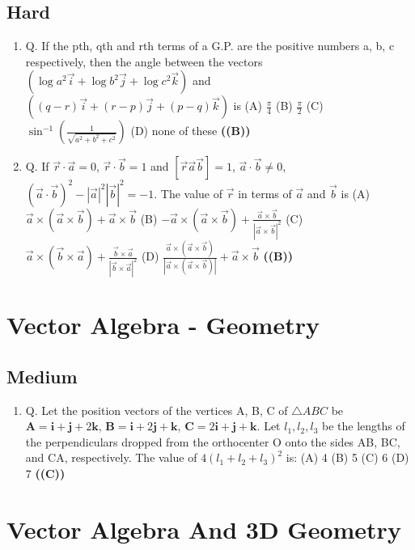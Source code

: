 \documentclass{article}
\begin{document}
\subsection{Hard}
\begin{enumerate}
\item Q. If the pth, qth and rth terms of a G.P. are the positive numbers a, b, c respectively, then the angle between the vectors $(\log a^2 \vec{i} + \log b^2 \vec{j} + \log c^2 \vec{k})$ and $((q-r)\vec{i} + (r-p)\vec{j} + (p-q) \vec{k})$ is
(A) $\frac{\pi}{4}$
(B) $\frac{\pi}{2}$
(C) $\sin^{-1}(\frac{1}{\sqrt{a^2+b^2+c^2}})$
(D) none of these \hfill \textbf{((B))}
\item Q. If $\vec{r}\cdot \vec{a} = 0$, $\vec{r}\cdot \vec{b} = 1$ and $[\vec{r}\vec{a}\vec{b}] = 1$, $\vec{a} \cdot \vec{b} \neq 0$, $(\vec{a} \cdot \vec{b})^2 - |\vec{a}|^2|\vec{b}|^2 = -1$. The value of $\vec{r}$ in terms of $\vec{a}$ and $\vec{b}$ is
(A) $\vec{a} \times (\vec{a} \times \vec{b}) + \vec{a} \times \vec{b}$
(B) $-\vec{a} \times (\vec{a} \times \vec{b}) + \frac{\vec{a}\times\vec{b}}{|\vec{a}\times\vec{b}|^2}$
(C) $\vec{a} \times (\vec{b}\times\vec{a}) + \frac{\vec{b}\times\vec{a}}{|\vec{b}\times\vec{a}|^2}$
(D) $\frac{\vec{a}\times(\vec{a}\times\vec{b})}{|\vec{a}\times(\vec{a}\times\vec{b})|} + \vec{a}\times\vec{b}$ \hfill \textbf{((B))}
\end{enumerate}
\section{Vector Algebra - Geometry}
\subsection{Medium}
\begin{enumerate}
\item Q. Let the position vectors of the vertices A, B, C of $\triangle ABC$ be
$\mathbf{A} = \mathbf{i} + \mathbf{j} + 2\mathbf{k}$, $\mathbf{B} = \mathbf{i} + 2\mathbf{j} + \mathbf{k}$, $\mathbf{C} = 2\mathbf{i} + \mathbf{j} + \mathbf{k}$.
Let $l_1, l_2, l_3$ be the lengths of the perpendiculars dropped from the orthocenter O onto the sides AB, BC, and CA, respectively. The value of $4(l_1 + l_2 + l_3)^2$ is:
(A) 4
(B) 5
(C) 6
(D) 7 \hfill \textbf{((C))}
\end{enumerate}
\section{Vector Algebra And 3D Geometry}
\end{document}
